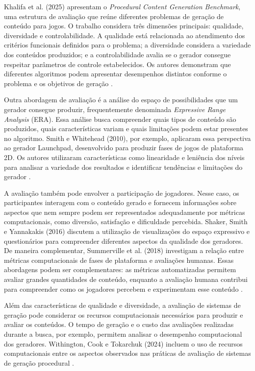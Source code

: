 Khalifa et al. (2025) apresentam o
\textit{Procedural Content Generation Benchmark}, uma
estrutura de avaliação que reúne diferentes problemas
de geração de conteúdo para jogos. O trabalho considera
três dimensões principais: qualidade, diversidade e
controlabilidade. A qualidade está relacionada ao
atendimento dos critérios funcionais definidos para
o problema; a diversidade considera a variedade dos
conteúdos produzidos; e a controlabilidade avalia se
o gerador consegue respeitar parâmetros de controle
estabelecidos. Os autores demonstram que diferentes
algoritmos podem apresentar desempenhos distintos
conforme o problema e os objetivos de geração
\cite{Khalifa2025}.

Outra abordagem de avaliação é a análise do espaço
de possibilidades que um gerador consegue produzir,
frequentemente denominada \textit{Expressive Range
Analysis} (ERA). Essa análise busca compreender quais
tipos de conteúdo são produzidos, quais características
variam e quais limitações podem estar presentes no
algoritmo. Smith e Whitehead (2010), por exemplo,
aplicaram essa perspectiva ao gerador Launchpad,
desenvolvido para produzir fases de jogos de plataforma
2D. Os autores utilizaram características como
linearidade e leniência dos níveis para analisar
a variedade dos resultados e identificar tendências
e limitações do gerador \cite{SmithWhitehead2010}.

A avaliação também pode envolver a participação de
jogadores. Nesse caso, os participantes interagem com
o conteúdo gerado e fornecem informações sobre aspectos
que nem sempre podem ser representados adequadamente
por métricas computacionais, como diversão, satisfação
e dificuldade percebida. Shaker, Smith e Yannakakis
(2016) discutem a utilização de visualizações do espaço
expressivo e questionários para compreender diferentes
aspectos da qualidade dos geradores. De maneira
complementar, Summerville et al. (2018) investigam
a relação entre métricas computacionais de fases
de plataforma e avaliações humanas. Essas abordagens
podem ser complementares: as métricas automatizadas
permitem avaliar grandes quantidades de conteúdo,
enquanto a avaliação humana contribui para compreender
como os jogadores percebem e experimentam esse conteúdo
\cite{ShakerSmithYannakakis2016,Summerville2018}.

Além das características de qualidade e diversidade,
a avaliação de sistemas de geração pode considerar
os recursos computacionais necessários para produzir
e avaliar os conteúdos. O tempo de geração e o custo
das avaliações realizadas durante a busca, por exemplo,
permitem analisar o desempenho computacional dos
geradores. Withington, Cook e Tokarchuk (2024) incluem
o uso de recursos computacionais entre os aspectos
observados nas práticas de avaliação de sistemas
de geração procedural \cite{Withington2024}.

